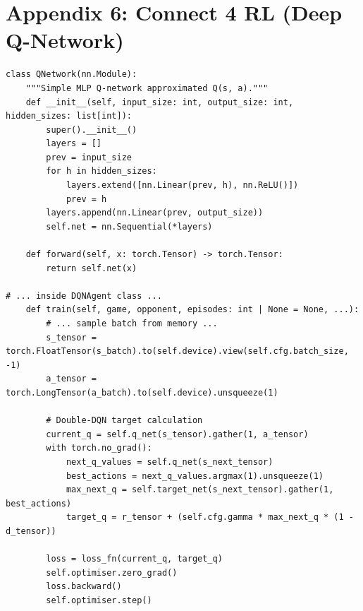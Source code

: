 \section{Appendix 6: Connect 4 RL (Deep Q-Network)}
{\small
\begin{lstlisting}[style=mypython]
class QNetwork(nn.Module):
    """Simple MLP Q-network approximated Q(s, a)."""
    def __init__(self, input_size: int, output_size: int, hidden_sizes: list[int]):
        super().__init__()
        layers = []
        prev = input_size
        for h in hidden_sizes:
            layers.extend([nn.Linear(prev, h), nn.ReLU()])
            prev = h
        layers.append(nn.Linear(prev, output_size))
        self.net = nn.Sequential(*layers)

    def forward(self, x: torch.Tensor) -> torch.Tensor:
        return self.net(x)

# ... inside DQNAgent class ...
    def train(self, game, opponent, episodes: int | None = None, ...):
        # ... sample batch from memory ...
        s_tensor = torch.FloatTensor(s_batch).to(self.device).view(self.cfg.batch_size, -1)
        a_tensor = torch.LongTensor(a_batch).to(self.device).unsqueeze(1)
        
        # Double-DQN target calculation
        current_q = self.q_net(s_tensor).gather(1, a_tensor)
        with torch.no_grad():
            next_q_values = self.q_net(s_next_tensor)
            best_actions = next_q_values.argmax(1).unsqueeze(1)
            max_next_q = self.target_net(s_next_tensor).gather(1, best_actions)
            target_q = r_tensor + (self.cfg.gamma * max_next_q * (1 - d_tensor))
        
        loss = loss_fn(current_q, target_q)
        self.optimiser.zero_grad()
        loss.backward()
        self.optimiser.step()
\end{lstlisting}
}
